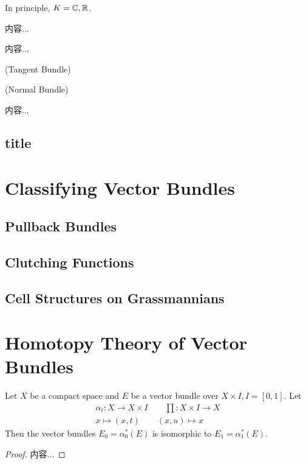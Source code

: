 \documentclass[Total.tex]{subfiles}
\begin{document}
			In principle, $K=\mathbb{C},\mathbb{R}$. 
			
			\begin{example}
				内容...
			\end{example}
			
			\begin{example}
				内容...
			\end{example}
			
			\begin{example}
				(Tangent Bundle)
			\end{example}
			
			\begin{example}
				(Normal Bundle)
			\end{example}
			
			\begin{example}
				内容...
			\end{example}
			
			\subsection{title}
		
		\section{Classifying Vector Bundles}
			\subsection{Pullback Bundles}
				
			\subsection{Clutching Functions}
			
			\subsection{Cell Structures on Grassmannians}
		\section{Homotopy Theory of Vector Bundles}
		
			\begin{theorem}
				Let $X$ be a compact space and $E$ be a vector bundle over $X\times I,I=[0,1]$. Let
				\begin{gather*}
					\alpha_t:X\rightarrow X\times I\qquad \prod:X\times I\rightarrow X\\
					x\mapsto (x,t)\qquad (x,u)\mapsto x
				\end{gather*}
				Then the vector bundles $E_0=\alpha_0^*(E)$ is isomorphic to $E_1=\alpha_1^*(E)$.
			\end{theorem}
			\begin{proof}
				内容...
			\end{proof}
			
\end{document}

